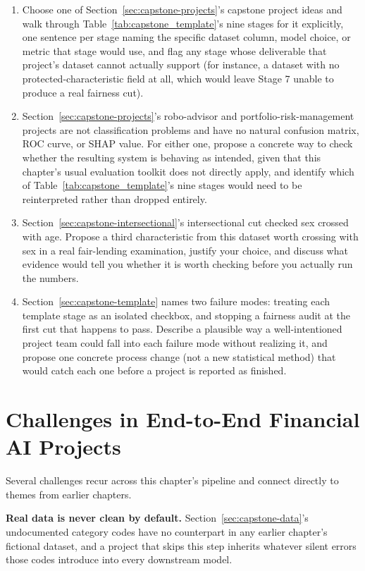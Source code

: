 \documentclass[../ai_in_finance]{subfiles}
\begin{document}
\begin{enumerate}
    \item Choose one of Section~\ref{sec:capstone-projects}'s capstone project ideas and walk through Table~\ref{tab:capstone_template}'s nine stages for it explicitly, one sentence per stage naming the specific dataset column, model choice, or metric that stage would use, and flag any stage whose deliverable that project's dataset cannot actually support (for instance, a dataset with no protected-characteristic field at all, which would leave Stage 7 unable to produce a real fairness cut).
    \item Section~\ref{sec:capstone-projects}'s robo-advisor and portfolio-risk-management projects are not classification problems and have no natural confusion matrix, ROC curve, or SHAP value. For either one, propose a concrete way to check whether the resulting system is behaving as intended, given that this chapter's usual evaluation toolkit does not directly apply, and identify which of Table~\ref{tab:capstone_template}'s nine stages would need to be reinterpreted rather than dropped entirely.
    \item Section~\ref{sec:capstone-intersectional}'s intersectional cut checked sex crossed with age. Propose a third characteristic from this dataset worth crossing with sex in a real fair-lending examination, justify your choice, and discuss what evidence would tell you whether it is worth checking before you actually run the numbers.
    \item Section~\ref{sec:capstone-template} names two failure modes: treating each template stage as an isolated checkbox, and stopping a fairness audit at the first cut that happens to pass. Describe a plausible way a well-intentioned project team could fall into each failure mode without realizing it, and propose one concrete process change (not a new statistical method) that would catch each one before a project is reported as finished.
\end{enumerate}

\section{Challenges in End-to-End Financial AI Projects}

Several challenges recur across this chapter's pipeline and connect directly to themes from earlier chapters.

\textbf{Real data is never clean by default.} Section~\ref{sec:capstone-data}'s undocumented category codes have no counterpart in any earlier chapter's fictional dataset, and a project that skips this step inherits whatever silent errors those codes introduce into every downstream model.
\end{document}
